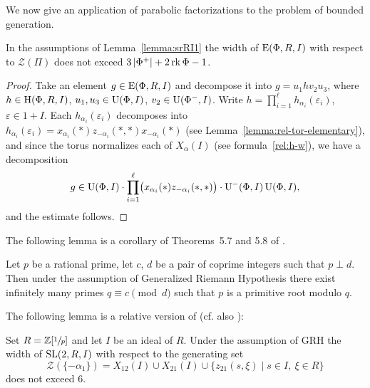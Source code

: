 We now give an application of parabolic factorizations to the problem of bounded generation.
 
\begin{lemma}\label{lemma:srRI1_width} In the assumptions of Lemma~\ref{lemma:srRI1} the width of $\operatorname{E}(\Phi,R,I)$ with respect to $\mathcal{Z}(\Pi)$ does not exceed $3\left|\Phi^+\right|+2\operatorname{rk}\Phi-1$. \end{lemma}
\begin{proof}
Take an element $g\in\operatorname{E}(\Phi,R,I)$ and decompose it into $g=u_1 h v_2 u_3$, where $h\in\operatorname{H}(\Phi,R,I)$, $u_1,u_3\in\operatorname{U}(\Phi,I)$, $v_2\in\operatorname{U}(\Phi^-,I)$. 
Write $h=\prod_{i=1}^\ell h_{\alpha_i}(\varepsilon_i)$, $\varepsilon\in1+I$. 
Each $h_{\alpha_i}(\varepsilon_i)$ decomposes into $h_{\alpha_i}(\varepsilon_i) = x_{\alpha_i}(*) z_{-\alpha_i}(*,*) x_{-\alpha_i}(*)$ 
 (see Lemma~\ref{lemma:rel-tor-elementary}), and since the torus normalizes each of $X_\alpha(I)$ (see formula~\ref{rel:h-w}), we have a decomposition
\[ g\in\operatorname{U}(\Phi,I)\cdot\prod_{i=1}^\ell\bigl(x_{\alpha_i}(*)z_{-\alpha_i}(*,*)\bigr)\cdot \operatorname{U}^-(\Phi,I) \operatorname{U}(\Phi,I), \]
and the estimate follows. \end{proof}

The following lemma is a corollary of Theorems~5.7 and 5.8 of \cite{LenMorStePrimitiveRoot}.
\begin{lemma}
Let $p$ be a rational prime, let $c$, $d$ be a pair of coprime integers such that $p \perp d$.
Then under the assumption of Generalized Riemann Hypothesis there exist infinitely many primes $q\equiv c\pmod{d}$ such that $p$ is a primitive root modulo $q$.
\end{lemma}

The following lemma is a relative version of \cite[Lemma~6]{VavSmSuUnitrEng} (cf. also \cite{VseUnitrZ1p}):

\begin{lemma}\label{lemma:Z1p}
Set $R=\mathbb{Z}[\sfrac{1}{p}]$ and let $I$ be an ideal of $R$.
Under the assumption of GRH the width of $\operatorname{SL}(2,R,I)$ with respect to the generating set $$\mathcal{Z}(\{-\alpha_1\})=X_{12}(I)\cup X_{21}(I) \cup \{z_{21}(s, \xi) \mid s\in I,\ \xi\in R\}$$ does not exceed $6$.
\end{lemma}


